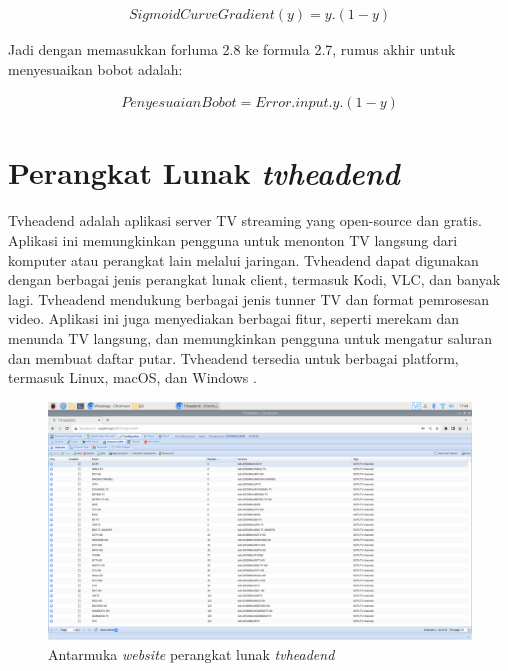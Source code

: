 \begin{equation}
	\begin{aligned}
		SigmoidCurveGradient(y)=y.(1-y)
	\end{aligned}
\end{equation}

Jadi dengan memasukkan forluma 2.8 ke formula 2.7, rumus akhir untuk menyesuaikan bobot adalah:

\begin{equation}
	\begin{aligned}
		Penyesuaian Bobot = Error.input.y.(1-y)
	\end{aligned}
\end{equation}


\section{Perangkat Lunak \textit{tvheadend}}
Tvheadend adalah aplikasi server TV streaming yang open-source dan gratis. Aplikasi ini memungkinkan pengguna untuk menonton TV langsung dari komputer atau perangkat lain melalui jaringan. Tvheadend dapat digunakan dengan berbagai jenis perangkat lunak client, termasuk Kodi, VLC, dan banyak lagi. Tvheadend mendukung berbagai jenis tunner TV dan format pemrosesan video. Aplikasi ini juga menyediakan berbagai fitur, seperti merekam dan menunda TV langsung, dan memungkinkan pengguna untuk mengatur saluran dan membuat daftar putar. Tvheadend tersedia untuk berbagai platform, termasuk Linux, macOS, dan Windows \citep{tvheadend2015}.

\begin{figure}[H]
	\vspace{-0.1cm}
	\begin{center}
		\includegraphics[width=1\columnwidth]{bab2/Gambar/tvheadend.png}
	\end{center}
	\vspace{-0.2cm}
	\caption{Antarmuka \textit{website} perangkat lunak \textit{tvheadend}}\label{TVHeadend}
\end{figure}

